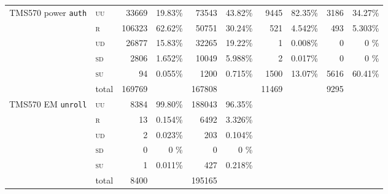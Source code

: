 \documentclass[10pt]{article}
\newcommand{\TI}{TMS570\xspace}
\newcommand{\unroll}{\texttt{unroll}\xspace}
\newcommand{\auth}{\texttt{auth}\xspace}
\newcommand{\UU}{\textsc{uu}\xspace}
\newcommand{\UD}{\textsc{ud}\xspace}
\newcommand{\SU}{\textsc{su}\xspace}
\newcommand{\SD}{\textsc{sd}\xspace}
\newcommand{\R}{\textsc{r}\xspace}
\begin{document}
\begin{appendices}
\begin{table}[H]
\begin{tabular}{ll rr rr rr rr}
    \midrule

    \multicolumn{1}{c}{\multirow{3}{*}{ \parbox{2cm}{\TI power \auth}}}
    & \UU    
    & 33669   & 19.83\%                     
    &  73543  & 43.82\%                 
    &  9445  & 82.35\%                 
    &  3186  & 34.27\%                      
    \\
    & \R   
    & 106323  & 62.62\%                     
    &  50751  & 30.24\%                 
    &  521   & 4.542\%                 
    &  493   & 5.303\%                      
    \\
    & \UD  
    & 26877   & 15.83\%                     
    &  32265  & 19.22\%                 
    &  1     & 0.008\%                 
    &  0     & 0    \%                      
    \\
    & \SD     
    & 2806    & 1.652\%                     
    &  10049  & 5.988\%                 
    &  2     & 0.017\%                 
    &  0     & 0    \%                      
    \\
    & \SU      
    & 94      & 0.055\%                     
    &  1200   & 0.715\%                 
    &  1500  & 13.07\%                 
    &  5616  & 60.41\%                      
    \\

    \cmidrule(l){2-10}
    & total    
    & 169769  &                           
    &  167808 &                       
    &  11469 &                       
    & 9295  &                                 
    \\

    \midrule

    \multicolumn{1}{c}{\multirow{3}{*}{ \parbox{2cm}{\TI EM \unroll}}}

    & \UU    
    & 8384   & 99.80\%                   
    &  188043 & 96.35\%    
    & & 
    & &
    \\
    & \R   
    & 13     & 0.154\%                   
    &  6492   & 3.326\%    
    & & 
    & &
    \\
    & \UD  
    & 2      & 0.023\%                   
    &  203    & 0.104\%    
    & & 
    & &
    \\
    & \SD     
    & 0      & 0    \%                   
    &  0      &  0    \%   
    & & 
    & &
    \\
    & \SU      
    & 1      & 0.011\%                   
    &  427    & 0.218\%    
    & & 
    & &
    \\

    \cmidrule(l){2-10}
    & total    
    & 8400   &                            
    &  195165 &             
    & & 
    & &
    \\   


\end{tabular}
\end{table}
\end{appendices}
\end{document}
